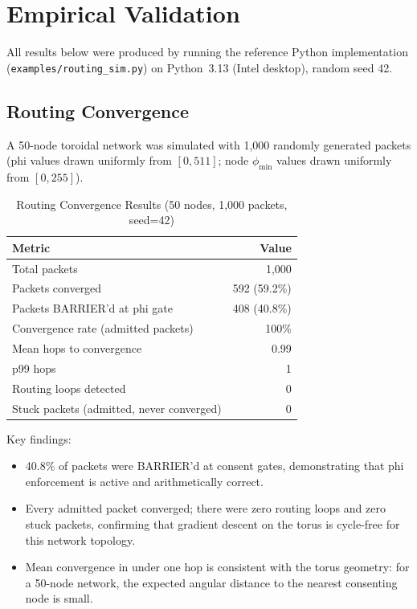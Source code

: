 \documentclass[11pt,a4paper]{article}
\begin{document}
\section{Empirical Validation}

All results below were produced by running the reference Python implementation
(\texttt{examples/routing\_sim.py}) on Python~3.13 (Intel desktop),
random seed 42.

\subsection{Routing Convergence}

A 50-node toroidal network was simulated with 1{,}000 randomly generated packets
(phi values drawn uniformly from $[0, 511]$; node $\phi_{\min}$ values drawn uniformly
from $[0, 255]$).

\begin{table}[h]
\centering
\begin{tabular}{lr}
\toprule
\textbf{Metric} & \textbf{Value} \\
\midrule
Total packets & 1{,}000 \\
Packets converged & 592 (59.2\%) \\
Packets BARRIER'd at phi gate & 408 (40.8\%) \\
Convergence rate (admitted packets) & 100\% \\
Mean hops to convergence & 0.99 \\
p99 hops & 1 \\
Routing loops detected & 0 \\
Stuck packets (admitted, never converged) & 0 \\
\bottomrule
\end{tabular}
\caption{Routing Convergence Results (50 nodes, 1{,}000 packets, seed=42)}
\label{tab:routing}
\end{table}

Key findings:
\begin{itemize}
    \item 40.8\% of packets were BARRIER'd at consent gates, demonstrating that phi enforcement is active and arithmetically correct.
    \item Every admitted packet converged; there were zero routing loops and zero stuck packets, confirming that gradient descent on the torus is cycle-free for this network topology.
    \item Mean convergence in under one hop is consistent with the torus geometry: for a 50-node network, the expected angular distance to the nearest consenting node is small.
\end{itemize}
\end{document}
